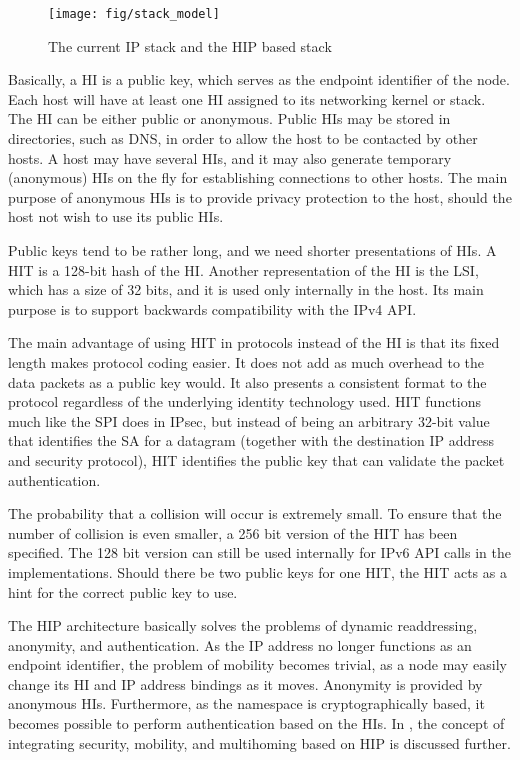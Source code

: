 \begin{figure}[htb]
\begin{center}
\texttt{[image: fig/stack\_model]}
\end{center}
\caption{The current IP stack and the \ac{HIP} based stack}
\label{fig:stack_model}
\end{figure}

Basically, a \ac{HI} is a public key, which serves as the endpoint
identifier of the node. Each host will have at least one \ac{HI}
assigned to its networking kernel or stack. The \ac{HI} can be either
public or anonymous. Public \acp{HI} may be stored in directories,
such as \ac{DNS}, in order to allow the host to be contacted by other
hosts. A host may have several \acp{HI}, and it may also generate
temporary (anonymous) \acp{HI} on the fly for establishing connections
to other hosts. The main purpose of anonymous \acp{HI} is to provide
privacy protection to the host, should the host not wish to use its
public \acp{HI}.

Public keys tend to be rather long, and we need shorter presentations
of \acp{HI}. A \ac{HIT} is a 128-bit hash of the \ac{HI}. Another
representation of the \ac{HI} is the \ac{LSI}, which has a size of 32
bits, and it is used only internally in the host. Its main purpose is
to support backwards compatibility with the IPv4 \ac{API}.

The main advantage of using \ac{HIT} in protocols instead of the
\ac{HI} is that its fixed length makes protocol coding easier. It does
not add as much overhead to the data packets as a public key would. It
also presents a consistent format to the protocol regardless of the
underlying identity technology used. \ac{HIT} functions much like the
\ac{SPI} does in \ac{IPsec}, but instead of being an arbitrary 32-bit
value that identifies the \ac{SA} for a datagram (together with the
destination IP address and security protocol), \ac{HIT} identifies the
public key that can validate the packet authentication.

The probability that a collision will occur is extremely small. To
ensure that the number of collision is even smaller, a 256 bit version
of the \ac{HIT} has been specified. The 128 bit version can still be
used internally for IPv6 API calls in the implementations. Should
there be two public keys for one \ac{HIT}, the \ac{HIT} acts as a hint
for the correct public key to use.

The \ac{HIP} architecture basically solves the problems of dynamic
readdressing, anonymity, and authentication. As the IP address no
longer functions as an endpoint identifier, the problem of mobility
becomes trivial, as a node may easily change its HI and IP address
bindings as it moves. Anonymity is provided by anonymous
\acp{HI}. Furthermore, as the namespace is cryptographically based, it
becomes possible to perform authentication based on the \acp{HI}. In
\cite{ndss-inthip}, the concept of integrating security, mobility, and
multihoming based on \ac{HIP} is discussed further.

